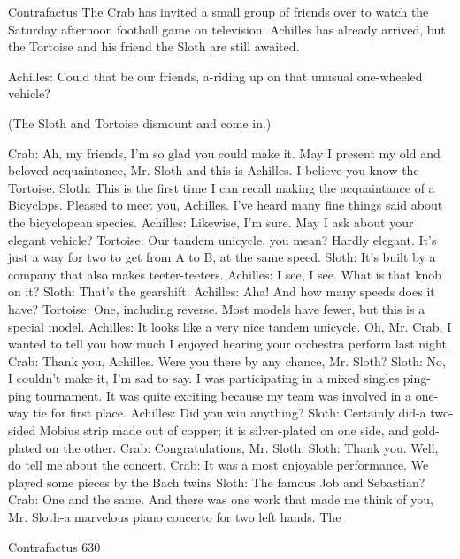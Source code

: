 
                                  Contrafactus
   The Crab has invited a small group of friends over to watch the Saturday
   afternoon football game on television. Achilles has already arrived, but the
   Tortoise and his friend the Sloth are still awaited.


Achilles: Could that be our friends, a-riding up on that unusual one-wheeled vehicle?

  (The Sloth and Tortoise dismount and come in.)

Crab: Ah, my friends, I'm so glad you could make it. May I present my old and beloved
   acquaintance, Mr. Sloth-and this is Achilles. I believe you know the Tortoise.
Sloth: This is the first time I can recall making the acquaintance of a Bicyclops. Pleased
   to meet you, Achilles. I've heard many fine things said about the bicyclopean species.
Achilles: Likewise, I'm sure. May I ask about your elegant vehicle? Tortoise: Our tandem
   unicycle, you mean? Hardly elegant. It's just a way for two to get from A to B, at the
   same speed.
Sloth: It's built by a company that also makes teeter-teeters.
Achilles: I see, I see. What is that knob on it?
Sloth: That's the gearshift.
Achilles: Aha! And how many speeds does it have?
Tortoise: One, including reverse. Most models have fewer, but this is a special model.
Achilles: It looks like a very nice tandem unicycle. Oh, Mr. Crab, I wanted to tell you
   how much I enjoyed hearing your orchestra perform last night.
Crab: Thank you, Achilles. Were you there by any chance, Mr. Sloth? Sloth: No, I
   couldn't make it, I'm sad to say. I was participating in a mixed singles ping-ping
   tournament. It was quite exciting because my team was involved in a one-way tie for
   first place.
Achilles: Did you win anything?
Sloth: Certainly did-a two-sided Mobius strip made out of copper; it is silver-plated on
   one side, and gold-plated on the other. Crab: Congratulations, Mr. Sloth.
Sloth: Thank you. Well, do tell me about the concert.
Crab: It was a most enjoyable performance. We played some pieces by the Bach twins
Sloth: The famous Job and Sebastian?
Crab: One and the same. And there was one work that made me think of you, Mr. Sloth-a
   marvelous piano concerto for two left hands. The




Contrafactus                                                                            630

